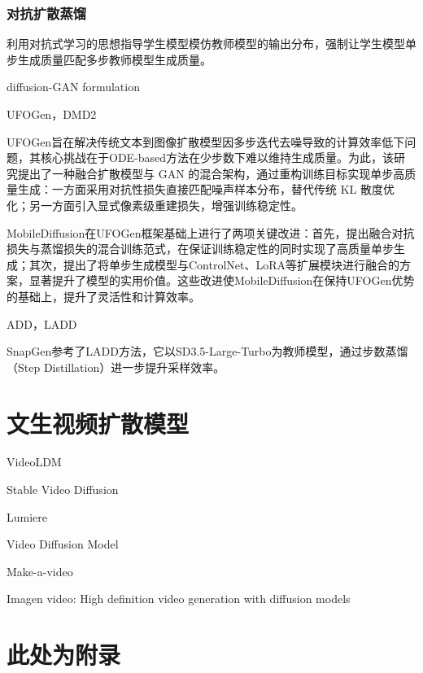 \documentclass[11pt,a4paper,UTF8]{ctexart}
\begin{document}
\subsubsection{对抗扩散蒸馏}

利用对抗式学习的思想指导学生模型模仿教师模型的输出分布，强制让学生模型单步生成质量匹配多步教师模型生成质量。

diffusion-GAN formulation\cite{wang2022diffusion,xiao2021tackling,xu2024semi}

UFOGen\cite{xu2024ufogen}，DMD2\cite{yin2024improved}

UFOGen\cite{xu2024ufogen}旨在解决传统文本到图像扩散模型因多步迭代去噪导致的计算效率低下问题，其核心挑战在于ODE-based方法在少步数下难以维持生成质量\cite{xu2024semi}。为此，该研究提出了一种融合扩散模型与 GAN 的混合架构，通过重构训练目标实现单步高质量生成：一方面采用对抗性损失直接匹配噪声样本分布，替代传统 KL 散度优化；另一方面引入显式像素级重建损失，增强训练稳定性。

MobileDiffusion\cite{zhao2024mobilediffusion}在UFOGen框架基础上进行了两项关键改进：首先，提出融合对抗损失与蒸馏损失的混合训练范式，在保证训练稳定性的同时实现了高质量单步生成；其次，提出了将单步生成模型与ControlNet、LoRA等扩展模块进行融合的方案，显著提升了模型的实用价值。这些改进使MobileDiffusion在保持UFOGen优势的基础上，提升了灵活性和计算效率。

ADD\cite{sauer2024adversarial}，LADD\cite{sauer2024fast}

SnapGen\cite{hu2024snapgen}参考了LADD方法，它以SD3.5-Large-Turbo为教师模型，通过步数蒸馏（Step Distillation）进一步提升采样效率。



\section{文生视频扩散模型}

VideoLDM\cite{blattmann2023videoldm}

Stable Video Diffusion\cite{blattmann2023stable}

Lumiere\cite{bar2024lumiere}

\cite{esser2023structure}

Video Diffusion Model\cite{ho2022video}

Make-a-video\cite{singer2022make}

Imagen video: High definition video generation with diffusion models

\newpage


\newpage
\appendix


\section{此处为附录}
\end{document}
